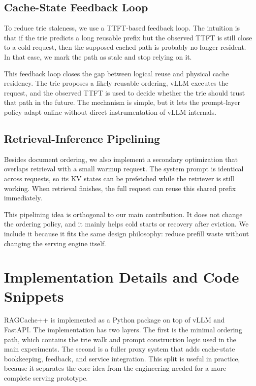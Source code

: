 \documentclass{article}
\begin{document}
\subsection{Cache-State Feedback Loop}
\label{sec:feedback}

To reduce trie staleness, we use a TTFT-based feedback loop. The intuition is that if the trie predicts a long reusable prefix but the observed TTFT is still close to a cold request, then the supposed cached path is probably no longer resident. In that case, we mark the path as stale and stop relying on it.

This feedback loop closes the gap between logical reuse and physical cache residency. The trie proposes a likely reusable ordering, vLLM executes the request, and the observed TTFT is used to decide whether the trie should trust that path in the future. The mechanism is simple, but it lets the prompt-layer policy adapt online without direct instrumentation of vLLM internals.

\subsection{Retrieval-Inference Pipelining}

Besides document ordering, we also implement a secondary optimization that overlaps retrieval with a small warmup request. The system prompt is identical across requests, so its KV states can be prefetched while the retriever is still working. When retrieval finishes, the full request can reuse this shared prefix immediately.

This pipelining idea is orthogonal to our main contribution. It does not change the ordering policy, and it mainly helps cold starts or recovery after eviction. We include it because it fits the same design philosophy: reduce prefill waste without changing the serving engine itself.


\section{Implementation Details and Code Snippets}
\label{sec:impl}

RAGCache++ is implemented as a Python package on top of vLLM and FastAPI. The implementation has two layers. The first is the minimal ordering path, which contains the trie walk and prompt construction logic used in the main experiments. The second is a fuller proxy system that adds cache-state bookkeeping, feedback, and service integration. This split is useful in practice, because it separates the core idea from the engineering needed for a more complete serving prototype.
\end{document}
